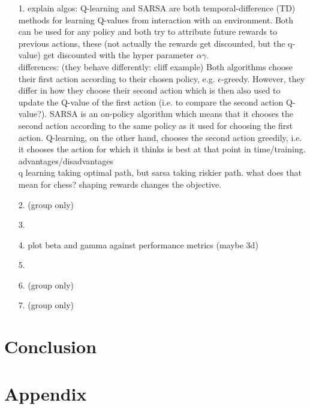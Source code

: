 \documentclass[11pt, a4paper, twocolumn]{article}
\begin{document}
\begin{itemize}
    \item[1.] explain algos: Q-learning and SARSA are both temporal-difference (TD) methods for learning Q-values from interaction with an environment. Both can be used for any policy and both try to attribute future rewards to previous actions, these (not actually the rewards get discounted, but the q-value) get discounted with the hyper parameter $\alpha\gamma$. \\
    differences: (they behave differently: cliff example) Both algorithms choose their first action according to their chosen policy, e.g. $\epsilon$-greedy. However, they differ in how they choose their second action which is then also used to update the Q-value of the first action (i.e. to compare the second action Q-value?). SARSA is an on-policy algorithm which means that it chooses the second action according to the same policy as it used for choosing the first action. Q-learning, on the other hand, chooses the second action greedily, i.e. it chooses the action for which it thinks is best at that point in time/training. \\
    advantages/disadvantages \\
    q learning taking optimal path, but sarsa taking riskier path. what does that mean for chess?
    shaping rewards changes the objective.

    \item[2. (group only)]
    \item[3.]
    \item[4.]  plot beta and gamma against performance metrics (maybe 3d)
    \item[5.] 
    \item[6. (group only)] 
    \item[7. (group only)] 
\end{itemize}


\section{Conclusion}



\section{Appendix}











    
\end{document}
